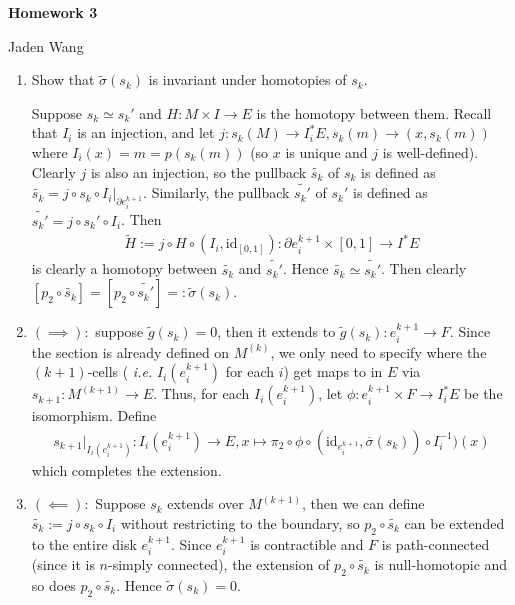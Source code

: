 \documentclass[12pt]{article}
\begin{document}
\centerline {\textsf{\textbf{\LARGE{Homework 3}}}}
\centerline {Jaden Wang}
\vspace{.15in}

\begin{problem}[1]
\begin{enumerate}[label=(\arabic*)]
	\item Show that $ \widetilde{ \sigma}(s_k)$ is invariant under homotopies of $ s_k$.

		Suppose $ s_k \simeq s_k'$ and $ H: M \times I \to E$ is the homotopy between them. Recall that $ I_i$ is an injection, and let $ j: s_k(M) \to I_i^* E, s_k(m) \to (x, s_k(m))$ where $ I_i(x) = m = p(s_k(m))$ (so $ x$ is unique and $ j$ is well-defined). Clearly $ j$ is also an injection, so the pullback  $ \widetilde{ s_k}$ of $ s_k$ is defined as $ \widetilde{ s_k} = j \circ s_k \circ I_i|_{ \partial e_i^{k+1}}$. Similarly, the pullback $ \widetilde{ s_k'}$ of $ s_k'$ is defined as $ \widetilde{ s_k'} = j \circ s_k' \circ I_i$. Then
		\begin{align*}
			\widetilde{ H}:= j \circ H \circ (I_i, \text{id}_{ [0,1]}): \partial e_i^{k+1} \times [0,1] \to I^* E
		\end{align*}
		is clearly a homotopy between $ \widetilde{ s_k}$ and $ \widetilde{ s_k'}$. Hence $ \widetilde{ s_k} \simeq \widetilde{ s_k'}$. Then clearly $ [p_2 \circ \widetilde{ s_k}] = [p_2 \circ \widetilde{ s_k'}] =: \widetilde{ \sigma}(s_k)$.
	\item $ (\implies):$ suppose $ \widetilde{ g}(s_k) = 0$, then it extends to $ \widetilde{ g}(s_k): e_i^{k+1} \to F$. Since the section is already defined on $ M^{(k)}$, we only need to specify where the $ (k+1)$-cells ( \emph{i.e.} $ I_i(e_i^{k+1})$ for each $ i$) get maps to in  $ E$ via $ s_{k+1}: M^{(k+1)} \to E$. Thus, for each $ I_i(e_i^{k+1})$, let $ \phi: e_i^{k+1} \times F \to I_i^* E$ be the isomorphism. Define
		\begin{align*}
			s_{k+1}|_{I_i(e_i^{k+1})}: I_i(e_i^{k+1}) \to E, x \mapsto \pi_2 \circ \phi \circ ( \text{id}_{ e_i^{k+1}},\overline{ \sigma}(s_k)) \circ  I_i^{-1})(x)
		\end{align*}
		which completes the extension.
	\item $ (\impliedby):$ Suppose $ s_k$ extends over $ M^{(k+1)}$, then we can define $ \widetilde{ s_k}:=j \circ s_k \circ I_i$ without restricting to the boundary, so $  p_2 \circ \widetilde{ s_k}$ can be extended to the entire disk $e_i^{k+1} $. Since $e_i^{k+1} $ is contractible and $ F$ is path-connected (since it is  $ n$-simply connected), the extension of $ p_2 \circ \widetilde{ s_k}$ is null-homotopic and so does $ p_2 \circ \widetilde{ s_k}$. Hence $ \widetilde{ \sigma}(s_k) = 0$.
\end{enumerate}
\end{problem}
\end{document}
